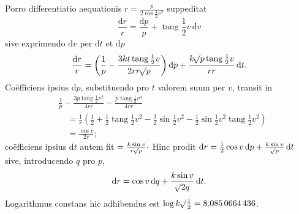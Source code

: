 Porro differentiatio aequationis $r=\frac{p}{2\cos\frac{1}{2}v^2}$ suppeditat
\[
\frac{\mathrm{d}r}{r}=\frac{\mathrm{d}p}{p}+\operatorname{tang}\frac{1}{2}v\,\mathrm{d}v
\]
sive exprimendo $\mathrm{d}v$ per $\mathrm{d}t$ et $\mathrm{d}p$
\[
\frac{\mathrm{d}r}{r}=\left(\frac{1}{p}-\frac{3k t\operatorname{tang}\frac{1}{2}v}{2r r\mathord{{}^{}\!\surd}p}\right)\mathrm{d}p+\frac{k\mathord{{}^{}\!\surd}p\operatorname{tang}\frac{1}{2}v}{r r}\,\mathrm{d}t.
\]
Coëfficiens ipsius $\mathrm{d}p$, substituendo pro $t$ valorem suum per $v$, transit in
\[
\begin{aligned}
&\frac{1}{p}-\frac{3p\operatorname{tang}\frac{1}{2}v^2}{4r r}-\frac{p\operatorname{tang}\frac{1}{2}v^4}{4r r}\\
&\quad=\frac{1}{r}\left(\frac{1}{2}+\frac{1}{2}\operatorname{tang}\frac{1}{2}v^2-\frac{3}{2}\sin\frac{1}{2}v^2-\frac{1}{2}\sin\frac{1}{2}v^2\operatorname{tang}\frac{1}{2}v^2\right)\\
&\quad=\frac{\cos v}{2r};
\end{aligned}
\]
coëfficiens ipsius $\mathrm{d}t$ autem fit $=\frac{k\sin v}{r\mathord{{}^{}\!\surd}p}\cdot$ Hinc prodit $\mathrm{d}r=\frac{1}{2}\cos v\,\mathrm{d}p+\frac{k\sin v}{\mathord{{}^{}\!\surd}p}\,\mathrm{d}t$ sive, introducendo $q$ pro $p$,
\[
\mathrm{d}r=\cos v\,\mathrm{d}q+\frac{k\sin v}{\mathord{{}^{}\!\surd}2q}\,\mathrm{d}t.
\]
Logarithmus constans hic adhibendus est $\log k\mathord{{}^{}\!\surd}\frac{1}{2}=8{,}085\,0664\,436$.
